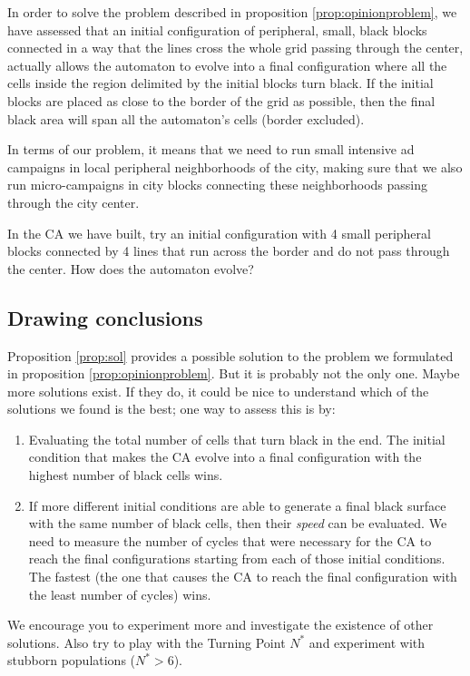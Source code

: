 \begin{proposition}
\label{prop:sol}
In order to solve the problem described in proposition \ref{prop:opinionproblem}, we have assessed that an
initial configuration of peripheral, small, black blocks connected in a way that the lines cross the whole grid
passing through the center, actually allows the automaton to evolve into a final configuration where all the cells
inside the region delimited by the initial blocks turn black. If the initial blocks are placed as close to the border
of the grid as possible, then the final black area will span all the automaton's cells (border excluded).

In terms of our problem, it means that we need to run small intensive ad campaigns in local peripheral neighborhoods
of the city, making sure that we also run micro-campaigns in city blocks connecting these neighborhoods passing through
the city center.
\end{proposition}

\begin{problem}
\label{prob:opinionproof1}
In the CA we have built, try an initial configuration with 4 small peripheral blocks connected by 4 lines that
run across the border and do not pass through the center. How does the automaton evolve?
\end{problem}

\subsection{Drawing conclusions}
Proposition \ref{prop:sol} provides a possible solution to the problem we formulated in proposition \ref{prop:opinionproblem}.
But it is probably not the only one. Maybe more solutions exist. If they do, it could be nice to understand which of
the solutions we found is the best; one way to assess this is by:

\begin{enumerate}
\item Evaluating the total number of cells that turn black in the end. The initial condition that makes the CA
evolve into a final configuration with the highest number of black cells wins.
\item If more different initial conditions are able to generate a final black surface with the same number of black cells,
then their \textit{speed} can be evaluated. We need to measure the number of cycles that were necessary for the CA to
reach the final configurations starting from each of those initial conditions. 
The fastest (the one that causes the CA to reach
the final configuration with the least number of cycles) wins.
\end{enumerate}

We encourage you to experiment more and investigate the existence of other solutions. Also try to play with the
Turning Point $N^\ast$ and experiment with stubborn populations ($N^\ast > 6$).
